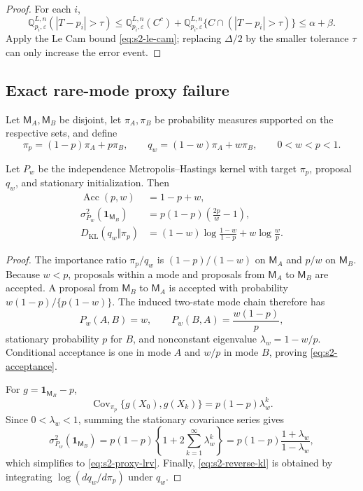 \begin{proof}
For each \(i\),
\[
 \mathbb Q_{p_i,\varepsilon}^{L,n}(|T-p_i|>\tau)
 \leq
 \mathbb Q_{p_i,\varepsilon}^{L,n}(C^c)
 +
 \mathbb Q_{p_i,\varepsilon}^{L,n}
 \{C\cap(|T-p_i|>\tau)\}
 \leq\alpha+\beta.
\]
Apply the Le Cam bound \eqref{eq:s2-le-cam}; replacing
\(\Delta/2\) by the smaller tolerance \(\tau\) can only increase the error
event.
\end{proof}

\subsection{Exact rare-mode proxy failure}
\label{subsec:stage2-proxy}

Let \(\mathsf M_A,\mathsf M_B\) be disjoint, let \(\pi_A,\pi_B\) be
probability measures supported on the respective sets, and define
\begin{equation}
 \pi_p=(1-p)\pi_A+p\pi_B,
 \qquad
 q_w=(1-w)\pi_A+w\pi_B,
 \qquad
 0<w<p<1.
 \label{eq:s2-mode-mixtures}
\end{equation}

\begin{theorem}
\label{thm:s2-proxy}
Let \(P_w\) be the independence Metropolis--Hastings kernel with target
\(\pi_p\), proposal \(q_w\), and stationary initialization.  Then
\begin{align}
 \operatorname{Acc}(p,w)
 &=
 1-p+w,
 \label{eq:s2-acceptance}\\
 \sigma_{P_w}^2(\mathbf 1_{\mathsf M_B})
 &=
 p(1-p)\left(\frac{2p}{w}-1\right),
 \label{eq:s2-proxy-lrv}\\
 D_{\mathrm{KL}}(q_w\Vert\pi_p)
 &=
 (1-w)\log\frac{1-w}{1-p}
 +
 w\log\frac{w}{p}.
 \label{eq:s2-reverse-kl}
\end{align}
\end{theorem}

\begin{proof}
The importance ratio \(\pi_p/q_w\) is \((1-p)/(1-w)\) on
\(\mathsf M_A\) and \(p/w\) on \(\mathsf M_B\).  Because \(w<p\), proposals
within a mode and proposals from \(\mathsf M_A\) to \(\mathsf M_B\) are
accepted.  A proposal from \(\mathsf M_B\) to \(\mathsf M_A\) is accepted with
probability \(w(1-p)/\{p(1-w)\}\).  The induced two-state mode chain therefore
has
\[
 P_w(A,B)=w,
 \qquad
 P_w(B,A)=\frac{w(1-p)}p,
\]
stationary probability \(p\) for \(B\), and nonconstant eigenvalue
\(\lambda_w=1-w/p\).  Conditional acceptance is one in mode \(A\) and
\(w/p\) in mode \(B\), proving \eqref{eq:s2-acceptance}.

For \(g=\mathbf 1_{\mathsf M_B}-p\),
\[
 \operatorname{Cov}_{\pi_p}\{g(X_0),g(X_k)\}
 =
 p(1-p)\lambda_w^k.
\]
Since \(0<\lambda_w<1\), summing the stationary covariance series gives
\[
 \sigma_{P_w}^2(\mathbf 1_{\mathsf M_B})
 =
 p(1-p)
 \left\{1+2\sum_{k=1}^{\infty}\lambda_w^k\right\}
 =
 p(1-p)\frac{1+\lambda_w}{1-\lambda_w},
\]
which simplifies to \eqref{eq:s2-proxy-lrv}.  Finally,
\eqref{eq:s2-reverse-kl} is obtained by integrating
\(\log(dq_w/d\pi_p)\) under \(q_w\).
\end{proof}

